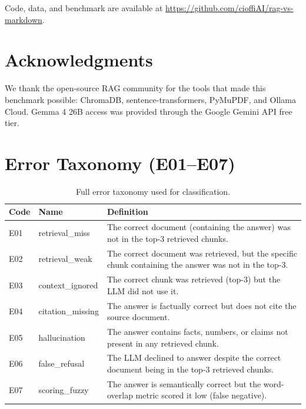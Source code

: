 \documentclass{article}
\begin{document}
Code, data, and benchmark are available at \url{https://github.com/cioffiAI/rag-vs-markdown}.

\section*{Acknowledgments}
We thank the open-source RAG community for the tools that made this benchmark possible: ChromaDB, sentence-transformers, PyMuPDF, and Ollama Cloud. Gemma 4 26B access was provided through the Google Gemini API free tier.




\newpage
\appendix

\section{Error Taxonomy (E01--E07)}
\label{sec:taxonomy}

\begin{table}[h]
    \centering
    \caption{Full error taxonomy used for classification.}
    \begin{tabular}{llp{7cm}}
        \toprule
        Code & Name & Definition \\
        \midrule
        E01 & retrieval\_miss & The correct document (containing the answer) was not in the top-3 retrieved chunks. \\
        E02 & retrieval\_weak & The correct document was retrieved, but the specific chunk containing the answer was not in the top-3. \\
        E03 & context\_ignored & The correct chunk was retrieved (top-3) but the LLM did not use it. \\
        E04 & citation\_missing & The answer is factually correct but does not cite the source document. \\
        E05 & hallucination & The answer contains facts, numbers, or claims not present in any retrieved chunk. \\
        E06 & false\_refusal & The LLM declined to answer despite the correct document being in the top-3 retrieved chunks. \\
        E07 & scoring\_fuzzy & The answer is semantically correct but the word-overlap metric scored it low (false negative). \\
        \bottomrule
    \end{tabular}
\end{table}
\end{document}
